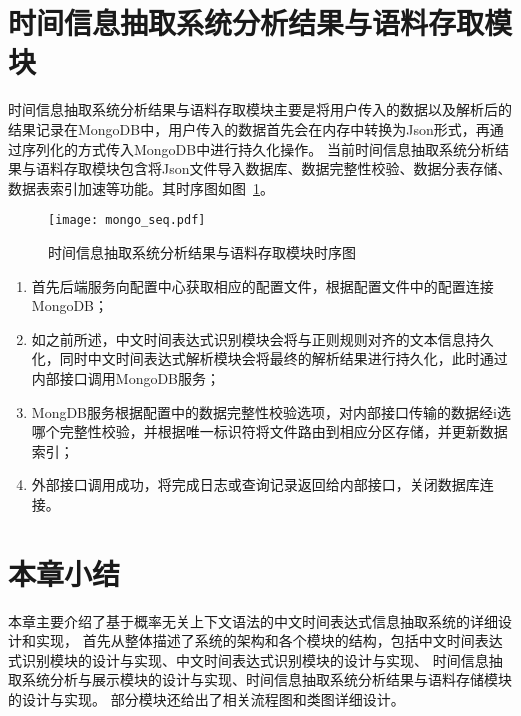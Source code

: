 

\section{时间信息抽取系统分析结果与语料存取模块}

时间信息抽取系统分析结果与语料存取模块主要是将用户传入的数据以及解析后的结果记录在MongoDB中，用户传入的数据首先会在内存中转换为Json形式，再通过序列化的方式传入MongoDB中进行持久化操作。
当前时间信息抽取系统分析结果与语料存取模块包含将Json文件导入数据库、数据完整性校验、数据分表存储、数据表索引加速等功能。其时序图如图~\ref{fig:mongo_seq}。


\begin{figure}[h]
    \centering
    \texttt{[image: mongo\_seq.pdf]}
    \caption{时间信息抽取系统分析结果与语料存取模块时序图}
    \label{fig:mongo_seq}
\end{figure}

\begin{enumerate}
    \item[(1)] 首先后端服务向配置中心获取相应的配置文件，根据配置文件中的配置连接MongoDB；
    \item[(2)] 如之前所述，中文时间表达式识别模块会将与正则规则对齐的文本信息持久化，同时中文时间表达式解析模块会将最终的解析结果进行持久化，此时通过内部接口调用MongoDB服务；
    \item[(3)] MongDB服务根据配置中的数据完整性校验选项，对内部接口传输的数据经i选哪个完整性校验，并根据唯一标识符将文件路由到相应分区存储，并更新数据索引；
    \item[(4)] 外部接口调用成功，将完成日志或查询记录返回给内部接口，关闭数据库连接。
\end{enumerate}


\section{本章小结}

本章主要介绍了基于概率无关上下文语法的中文时间表达式信息抽取系统的详细设计和实现，
首先从整体描述了系统的架构和各个模块的结构，包括中文时间表达式识别模块的设计与实现、中文时间表达式识别模块的设计与实现、
时间信息抽取系统分析与展示模块的设计与实现、时间信息抽取系统分析结果与语料存储模块的设计与实现。
部分模块还给出了相关流程图和类图详细设计。
